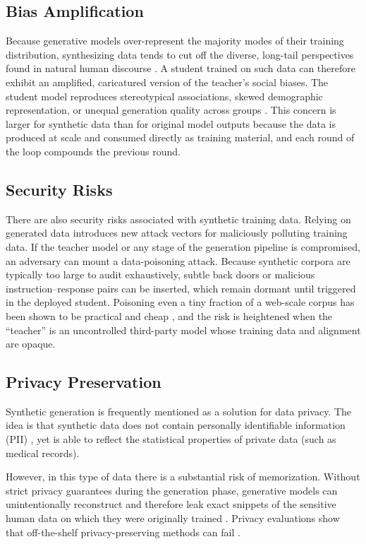 \subsection{Bias Amplification}
Because generative models over-represent the majority modes of their training distribution, synthesizing data tends to cut off  the diverse, long-tail perspectives found in natural human discourse \citep{van-der-meer-etal-2024-empirical}. A student trained on such data can therefore exhibit an amplified, caricatured version of the teacher's social biases. The student model  reproduces stereotypical associations, skewed demographic representation, or unequal generation quality across groups \citep{gallegos2024bias}. This concern is larger for synthetic data than for original model outputs because the data is produced at scale and consumed directly as training material, and each round of the loop  compounds the previous round.

\subsection{Security Risks}
There are also security risks associated with synthetic training data. Relying on generated data introduces new attack vectors for maliciously polluting training data. If the teacher model or any stage of the generation pipeline is compromised, an adversary can mount a data-poisoning attack. Because synthetic corpora are typically too large to audit exhaustively, subtle back doors or malicious instruction--response pairs can be inserted, which  remain dormant until triggered in the deployed student. Poisoning even a tiny fraction of a web-scale corpus has been shown to be practical and cheap \citep{carlini2024poisoning}, and the risk is heightened when the ``teacher'' is an uncontrolled third-party model whose training data and alignment are opaque.

\subsection{Privacy Preservation}
Synthetic generation is frequently mentioned as a solution for data privacy. The idea is that synthetic data does not contain  personally identifiable information (PII) \citep{dwork2014algorithmic}, yet is able to reflect the statistical properties of  private data (such as medical records). 

However, in this type of data there is a substantial risk of memorization. Without strict privacy guarantees during the generation phase, generative models can unintentionally reconstruct and therefore leak exact snippets of the sensitive human data on which they  were originally trained \citep{274574}.
Privacy evaluations show that off-the-shelf privacy-preserving methods can fail \citep{ramesh-etal-2024-evaluating}. 

